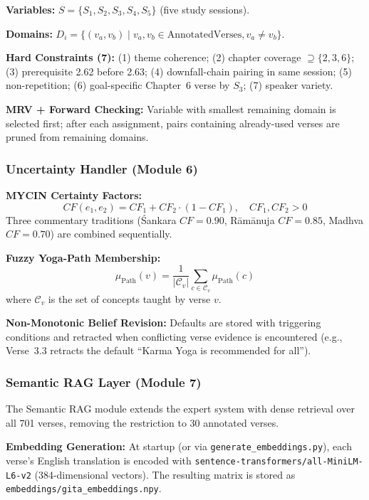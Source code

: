 \documentclass[conference]{IEEEtran}
\begin{document}
\textbf{Variables:} $S = \{S_1, S_2, S_3, S_4, S_5\}$ (five study sessions).

\textbf{Domains:} $D_i = \{(v_a, v_b) \mid v_a, v_b \in \text{AnnotatedVerses}, v_a \neq v_b\}$.

\textbf{Hard Constraints (7):} (1) theme coherence; (2) chapter coverage
$\supseteq \{2,3,6\}$; (3) prerequisite 2.62 before 2.63;
(4) downfall-chain pairing in same session; (5) non-repetition;
(6) goal-specific Chapter~6 verse by $S_3$; (7) speaker variety.

\textbf{MRV + Forward Checking:} Variable with smallest remaining domain
is selected first; after each assignment, pairs containing already-used
verses are pruned from remaining domains.

\subsubsection{Uncertainty Handler (Module 6)}

\textbf{MYCIN Certainty Factors:}
\begin{equation}
  CF(e_1, e_2) = CF_1 + CF_2 \cdot (1 - CF_1), \quad CF_1, CF_2 > 0
  \label{eq:mycin}
\end{equation}
Three commentary traditions (\'Sankara $CF = 0.90$, R\={a}m\={a}nuja
$CF = 0.85$, Madhva $CF = 0.70$) are combined sequentially.

\textbf{Fuzzy Yoga-Path Membership:}
\begin{equation}
  \mu_{\text{Path}}(v) = \frac{1}{|\mathcal{C}_v|}
  \sum_{c \in \mathcal{C}_v} \mu_{\text{Path}}(c)
  \label{eq:fuzzy}
\end{equation}
where $\mathcal{C}_v$ is the set of concepts taught by verse $v$.

\textbf{Non-Monotonic Belief Revision:} Defaults are stored with triggering
conditions and retracted when conflicting verse evidence is encountered
(e.g., Verse~3.3 retracts the default ``Karma Yoga is recommended for all'').

\subsubsection{Semantic RAG Layer (Module 7)}

The Semantic RAG module extends the expert system with dense retrieval
over all 701 verses, removing the restriction to 30 annotated verses.

\textbf{Embedding Generation:} At startup (or via \texttt{generate\_embeddings.py}),
each verse's English translation is encoded with
\texttt{sentence-transformers/all-MiniLM-L6-v2} (384-dimensional vectors).
The resulting matrix is stored as \texttt{embeddings/gita\_embeddings.npy}.
\end{document}
